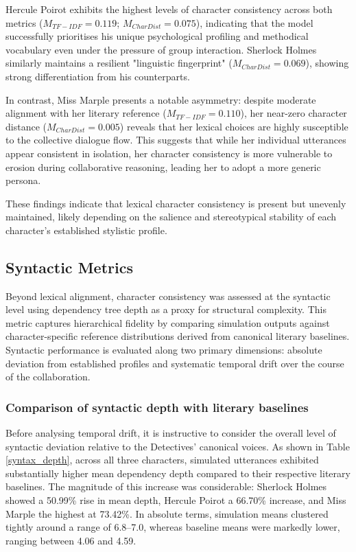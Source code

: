 \documentclass{article}
\begin{document}
Hercule Poirot exhibits the highest levels of character consistency across both metrics ($M_{TF-IDF}=0.119$; $M_{CharDist}=0.075$), indicating that the model successfully prioritises his unique psychological profiling and methodical vocabulary even under the pressure of group interaction. Sherlock Holmes similarly maintains a resilient "linguistic fingerprint" ($M_{CharDist}=0.069$), showing strong differentiation from his counterparts.

In contrast, Miss Marple presents a notable asymmetry: despite moderate alignment with her literary reference ($M_{TF-IDF}=0.110$), her near-zero character distance ($M_{CharDist}=0.005$) reveals that her lexical choices are highly susceptible to the collective dialogue flow. This suggests that while her individual utterances appear consistent in isolation, her character consistency is more vulnerable to erosion during collaborative reasoning, leading her to adopt a more generic persona.

These findings indicate that lexical character consistency is present but unevenly maintained, likely depending on the salience and stereotypical stability of each character’s established stylistic profile.


\subsection{Syntactic Metrics}

Beyond lexical alignment, character consistency was assessed at the syntactic level using dependency tree depth as a proxy for structural complexity. This metric captures hierarchical fidelity by comparing simulation outputs against character-specific reference distributions derived from canonical literary baselines. Syntactic performance is evaluated along two primary dimensions: absolute deviation from established profiles and systematic temporal drift over the course of the collaboration.

\subsubsection{Comparison of syntactic depth with literary baselines}

Before analysing temporal drift, it is instructive to consider the overall level of syntactic deviation relative to the Detectives' canonical voices. As shown in Table \ref{syntax_depth}, across all three characters, simulated utterances exhibited substantially higher mean dependency depth compared to their respective literary baselines. The magnitude of this increase was considerable: Sherlock Holmes showed a 50.99\% rise in mean depth, Hercule Poirot a 66.70\% increase, and Miss Marple the highest at 73.42\%. In absolute terms, simulation means clustered tightly around a range of 6.8–7.0, whereas baseline means were markedly lower, ranging between 4.06 and 4.59.
\end{document}
